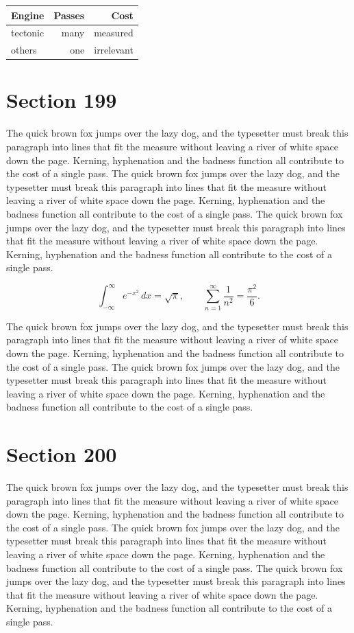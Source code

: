 \documentclass{article}
\begin{document}
\begin{center}
\begin{tabular}{lrr}
\toprule
Engine & Passes & Cost \\
\midrule
tectonic & many & measured \\
others & one & irrelevant \\
\bottomrule
\end{tabular}
\end{center}

\section{Section 199}
The quick brown fox jumps over the lazy dog, and the typesetter must break this paragraph into lines that fit the measure without leaving a river of white space down the page. Kerning, hyphenation and the badness function all contribute to the cost of a single pass. The quick brown fox jumps over the lazy dog, and the typesetter must break this paragraph into lines that fit the measure without leaving a river of white space down the page. Kerning, hyphenation and the badness function all contribute to the cost of a single pass. The quick brown fox jumps over the lazy dog, and the typesetter must break this paragraph into lines that fit the measure without leaving a river of white space down the page. Kerning, hyphenation and the badness function all contribute to the cost of a single pass. 

\begin{equation}
\int_{-\infty}^{\infty} e^{-x^{2}}\,dx = \sqrt{\pi}, \qquad
\sum_{n=1}^{\infty} \frac{1}{n^{2}} = \frac{\pi^{2}}{6}.
\end{equation}

The quick brown fox jumps over the lazy dog, and the typesetter must break this paragraph into lines that fit the measure without leaving a river of white space down the page. Kerning, hyphenation and the badness function all contribute to the cost of a single pass. The quick brown fox jumps over the lazy dog, and the typesetter must break this paragraph into lines that fit the measure without leaving a river of white space down the page. Kerning, hyphenation and the badness function all contribute to the cost of a single pass. 
\section{Section 200}
The quick brown fox jumps over the lazy dog, and the typesetter must break this paragraph into lines that fit the measure without leaving a river of white space down the page. Kerning, hyphenation and the badness function all contribute to the cost of a single pass. The quick brown fox jumps over the lazy dog, and the typesetter must break this paragraph into lines that fit the measure without leaving a river of white space down the page. Kerning, hyphenation and the badness function all contribute to the cost of a single pass. The quick brown fox jumps over the lazy dog, and the typesetter must break this paragraph into lines that fit the measure without leaving a river of white space down the page. Kerning, hyphenation and the badness function all contribute to the cost of a single pass. 
\end{document}
